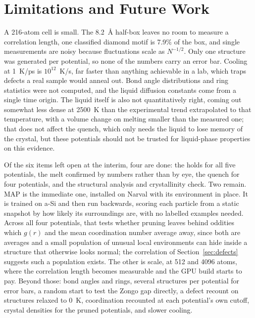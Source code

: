 \documentclass[11pt]{article}
\begin{document}
\section{Limitations and Future Work}

A 216-atom cell is small. The 8.2~\AA{} half-box leaves no room to measure a correlation length, one classified diamond motif is 7.9\% of the box, and single measurements are noisy because fluctuations scale as $N^{-1/2}$. Only one structure was generated per potential, so none of the numbers carry an error bar. Cooling at 1~K/ps is $10^{12}$~K/s, far faster than anything achievable in a lab, which traps defects a real sample would anneal out. Bond angle distributions and ring statistics were not computed, and the liquid diffusion constants come from a single time origin. The liquid itself is also not quantitatively right, coming out somewhat less dense at 2500~K than the experimental trend extrapolated to that temperature, with a volume change on melting smaller than the measured one; that does not affect the quench, which only needs the liquid to lose memory of the crystal, but these potentials should not be trusted for liquid-phase properties on this evidence.

Of the six items left open at the interim, four are done: the holds for all five potentials, the melt confirmed by numbers rather than by eye, the quench for four potentials, and the structural analysis and crystallinity check. Two remain. MAP is the immediate one, installed on Narval with its environment in place. It is trained on a-Si and then run backwards, scoring each particle from a static snapshot by how likely its surroundings are, with no labelled examples needed. Across all four potentials, that tests whether pruning leaves behind oddities which $g(r)$ and the mean coordination number average away, since both are averages and a small population of unusual local environments can hide inside a structure that otherwise looks normal; the correlation of Section~\ref{sec:defects} suggests such a population exists. The other is scale, at 512 and 4096 atoms, where the correlation length becomes measurable and the GPU build starts to pay. Beyond those: bond angles and rings, several structures per potential for error bars, a random start to test the Zongo gap directly, a defect recount on structures relaxed to 0~K, coordination recounted at each potential's own cutoff, crystal densities for the pruned potentials, and slower cooling.
\end{document}
